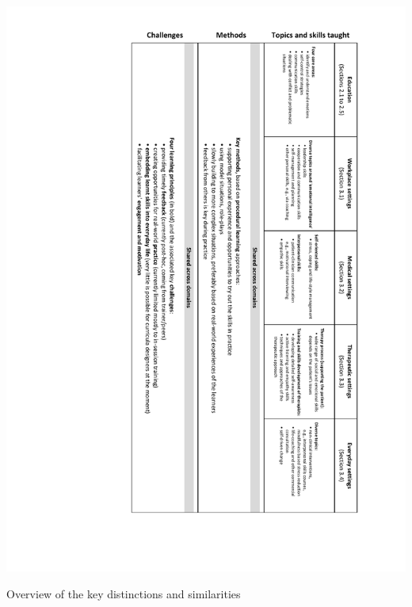 \documentclass[prodmode,acmtochi]{acmsmall}
\begin{document}

\begin{table}
\centering
	\includegraphics[height=\textheight]{images/SummaryResults}
	\caption{Overview of the key distinctions and similarities}
	\label{fig:SummaryResults}
\end{table}
%




\vfill ~ \pagebreak
\end{document}
